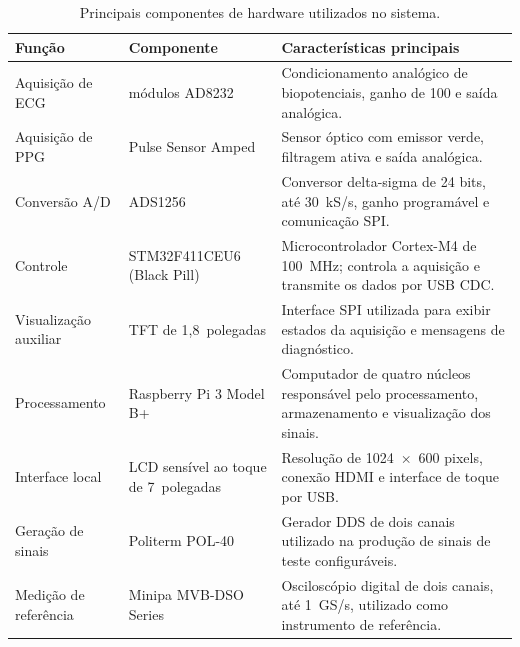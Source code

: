 \documentclass[a4paper,12pt]{fcte}
\begin{document}
\begin{table}[!htbp]
    \centering
    \caption{Principais componentes de hardware utilizados no sistema.}
    \label{tab:materiais_hardware}
    \renewcommand{\arraystretch}{1.15}
    \small
    \begin{tabularx}{\linewidth}{
        >{\raggedright\arraybackslash}p{2.5cm}
        >{\raggedright\arraybackslash}p{3.5cm}
        X
    }
        \toprule
        \textbf{Função} &
        \textbf{Componente} &
        \textbf{Características principais} \\
        \midrule

        Aquisição de ECG &
        2 módulos AD8232 &
        Condicionamento analógico de biopotenciais, ganho de 100 e saída analógica. \\

        Aquisição de PPG &
        Pulse Sensor Amped &
        Sensor óptico com emissor verde, filtragem ativa e saída analógica. \\

        Conversão A/D &
        ADS1256 &
        Conversor delta-sigma de 24 bits, até 30~kS/s, ganho programável e comunicação SPI. \\

        Controle &
        STM32F411CEU6 (Black Pill) &
        Microcontrolador Cortex-M4 de 100~MHz; controla a aquisição e transmite os dados por USB CDC. \\

        Visualização auxiliar &
        TFT de 1,8~polegadas &
        Interface SPI utilizada para exibir estados da aquisição e mensagens de diagnóstico. \\

        Processamento &
        Raspberry Pi 3 Model B+ &
        Computador de quatro núcleos responsável pelo processamento, armazenamento e visualização dos sinais. \\

        Interface local &
        LCD sensível ao toque de 7~polegadas &
        Resolução de 1024~$\times$~600 pixels, conexão HDMI e interface de toque por USB. \\

        Geração de sinais &
        Politerm POL-40 &
        Gerador DDS de dois canais utilizado na produção de sinais de teste configuráveis. \\

        Medição de referência &
        Minipa MVB-DSO Series &
        Osciloscópio digital de dois canais, até 1~GS/s, utilizado como instrumento de referência. \\

        \bottomrule
    \end{tabularx}
\end{table}
\end{document}
